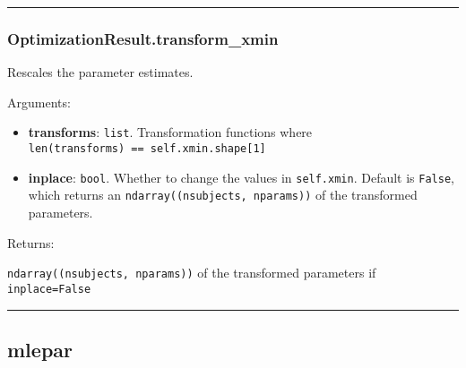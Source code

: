 \begin{center}\rule{0.5\linewidth}{\linethickness}\end{center}

\subsubsection{OptimizationResult.transform\_xmin}\label{optimizationresult.transform_xmin}

\begin{Shaded}
\begin{Highlighting}[]
\OperatorTok{=}\NormalTok{)}
\end{Highlighting}
\end{Shaded}

Rescales the parameter estimates.

Arguments:

\begin{itemize}
\tightlist
\item
  \textbf{transforms}: \texttt{list}. Transformation functions where
  \texttt{len(transforms)\ ==\ self.xmin.shape{[}1{]}}
\item
  \textbf{inplace}: \texttt{bool}. Whether to change the values in
  \texttt{self.xmin}. Default is \texttt{False}, which returns an
  \texttt{ndarray((nsubjects,\ nparams))} of the transformed parameters.
\end{itemize}

Returns:

\texttt{ndarray((nsubjects,\ nparams))} of the transformed parameters if
\texttt{inplace=False}

\begin{center}\rule{0.5\linewidth}{\linethickness}\end{center}

\subsection{mlepar}\label{mlepar}

\begin{Shaded}
\begin{Highlighting}[]
\OperatorTok{=}\OperatorTok{=}\OperatorTok{=}\OperatorTok{=}\OperatorTok{=-}\OperatorTok{=}\OperatorTok{=}\OperatorTok{=}\NormalTok{)}
\end{Highlighting}
\end{Shaded}

